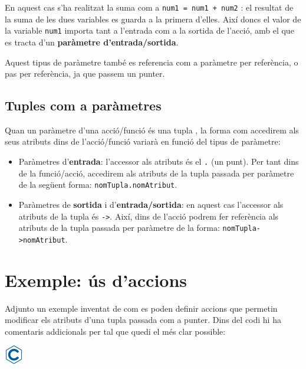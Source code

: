 \documentclass[]{book}
\providecommand{\tightlist}{%
  \setlength{\itemsep}{0pt}\setlength{\parskip}{0pt}}
\begin{document}
En aquest cas s'ha realitzat la suma com a \texttt{num1\ =\ num1\ +\ num2} : el resultat de la suma de les dues variables es guarda a la primera d'elles. Així doncs el valor de la variable \texttt{num1} importa tant a l'entrada com a la sortida de l'acció, amb el que es tracta d'un \textbf{paràmetre d'entrada/sortida}.

Aquest tipus de paràmetre també es referencia com a paràmetre per referència, o pas per referència, ja que passem un punter.

\hypertarget{tuples-com-a-parametres}{%
\subsection{Tuples com a paràmetres}\label{tuples-com-a-parametres}}

Quan un paràmetre d'una acció/funció és una tupla , la forma com accedirem als seus atributs dins de l'acció/funció variarà en funció del tipus de paràmetre:

\begin{itemize}
\tightlist
\item
  Paràmetres d'\textbf{entrada}: l'accessor als atributs és el \texttt{.} (un punt). Per tant dins de la funció/acció, accedirem als atributs de la tupla passada per paràmetre de la següent forma: \texttt{nomTupla.nomAtribut}.
\item
  Paràmetres de \textbf{sortida} i d'\textbf{entrada/sortida}: en aquest cas l'accessor als atributs de la tupla és \texttt{-\textgreater{}}. Així, dins de l'acció podrem fer referència als atributs de la tupla passada per paràmetre de la forma: \texttt{nomTupla-\textgreater{}nomAtribut}.
\end{itemize}

\hypertarget{exemple-us-daccions}{%
\section{Exemple: ús d'accions}\label{exemple-us-daccions}}

Adjunto un exemple inventat de com es poden definir accions que permetin modificar els atributs d'una tupla passada com a punter. Dins del codi hi ha comentaris addicionals per tal que quedi el més clar possible:

\includegraphics{./img/c.png}
\end{document}
